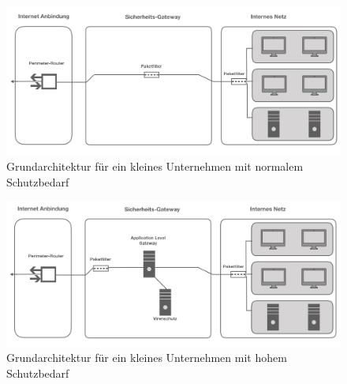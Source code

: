 \begin{figure}
	\includegraphics[width=\linewidth]{klUnternHoch.jpeg}
	\caption{Grundarchitektur für ein kleines Unternehmen mit normalem Schutzbedarf}
	\label{klUnorm}
\end{figure}

\begin{figure}
	\includegraphics[width= \linewidth]{klUnternehmnorm}
	\caption{Grundarchitektur für ein kleines Unternehmen mit hohem Schutzbedarf}
	\label{klUhoch}
\end{figure}